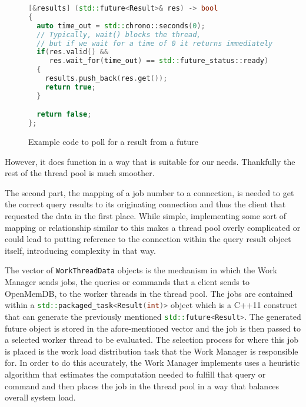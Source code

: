 \documentclass[letterpaper, 12pt]{article}
\newcommand{\inlinecode}[1]{\colorbox{codegrey}{\lstinline[language=C++]{#1}}}
\begin{document}
  \begin{figure}
  \label{code:clunk_future}
  \begin{lstlisting}[language=C++]
[&results] (std::future<Result>& res) -> bool
{
  auto time_out = std::chrono::seconds(0);
  // Typically, wait() blocks the thread,
  // but if we wait for a time of 0 it returns immediately
  if(res.valid() &&
     res.wait_for(time_out) == std::future_status::ready)
  {
    results.push_back(res.get());
    return true;
  }

  return false;
};
  \end{lstlisting}
  
  \caption{Example code to poll for a result from a future}
  \end{figure}
  
  However, it does function in a way that is suitable for our needs. Thankfully the rest of the thread
  pool is much smoother.
  \par\vspace{\baselineskip}
  The second part, the mapping of a job number to a connection, is needed to get the correct query results
  to its originating connection and thus the client that requested the data in the first place. While simple,
  implementing some sort of mapping or relationship similar to this makes a thread pool overly complicated
  or could lead to putting reference to the connection within the query result object itself, introducing
  complexity in that way.
  \par\vspace{\baselineskip}
  The vector of \lstinline[]|WorkThreadData| objects is the mechanism in
  which the Work Manager sends jobs, the queries or commands that a client sends to OpenMemDB, to the
  worker threads in the thread pool. The jobs are contained within a \lstinline[language=C++]|std::packaged_task<Result(int)>|
  object which is a C++11 construct that can generate the previously mentioned \inlinecode{std::future<Result>}.
  The generated future object is stored in the afore-mentioned vector and the job is then passed to a selected
  worker thread to be evaluated. The selection process for where this job is placed is the work load distribution
  task that the Work Manager is responsible for. In order to do this accurately, the Work Manager implements
  uses a heuristic algorithm that estimates the computation needed to fulfill that query or command
  and then places the job in the thread pool in a way that balances overall system load.
  \par\vspace{\baselineskip}
\end{document}
